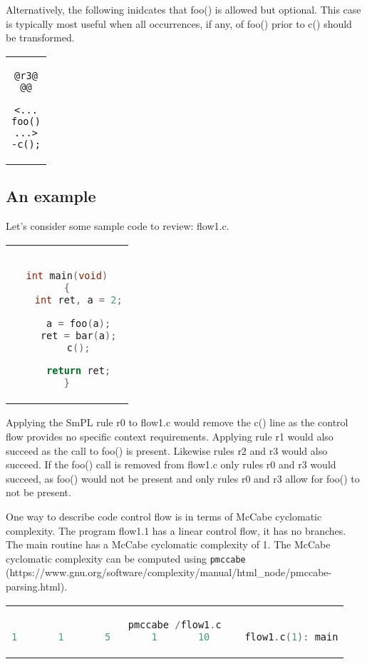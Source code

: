 Alternatively, the following inidcates that foo() is allowed but optional.
This case is typically most useful when all occurrences, if any, of foo()
prior to c() should be transformed.

\begin{center}
\begin{tabular}{c}
\begin{lstlisting}[language=Cocci]
@r3@
@@

<...
foo()
...>
-c();

\end{lstlisting}\\
\end{tabular}
\end{center}

\subsection{An example}
Let's consider some sample code to review: flow1.c.

\begin{center}
\begin{tabular}{c}
\begin{lstlisting}[language=C]

int main(void)
{
	int ret, a = 2;

	a = foo(a);
	ret = bar(a);
	c();

	return ret;
}
\end{lstlisting}\\
\end{tabular}
\end{center}

Applying the SmPL rule r0 to flow1.c would remove the c() line as the control
flow provides no specific context requirements. Applying rule r1 would also
succeed as the call to foo() is present. Likewise rules r2 and r3 would also
succeed. If the foo() call is removed from flow1.c only rules r0 and r3 would
succeed, as foo() would not be present and only rules r0 and r3 allow for
foo() to not be present.

One way to describe code control flow is in terms of McCabe cyclomatic
complexity.
The program flow1.1 has a linear control flow, it has no branches. The main
routine has a McCabe cyclomatic complexity of 1. The McCabe cyclomatic
complexity can be computed using
{\tt pmccabe} (https://www.gnu.org/\-software/\-complexity/\-manual/\-html\_node/\-pmccabe-parsing.html).

\begin{center}
\begin{tabular}{c}
\begin{lstlisting}[language=C]
pmccabe /flow1.c
1       1       5       1       10      flow1.c(1): main
\end{lstlisting}\\
\end{tabular}
\end{center}


